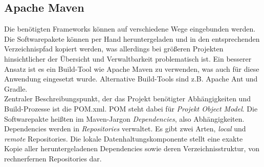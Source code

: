 \subsection{Apache Maven}
Die benötigten Frameworks können auf verschiedene Wege eingebunden werden. Die Softwarepakete können per Hand heruntergeladen und in den entsprechenden Verzeichnispfad kopiert werden, was allerdings bei größeren Projekten hinsichtlicher der Übersicht und Verwaltbarkeit problematisch ist. Ein besserer Ansatz ist es ein Build-Tool wie Apache Maven zu verwenden, was auch für diese Anwendung eingesetzt wurde. Alternative Build-Tools sind z.B. Apache Ant und Gradle.\\
Zentraler Beschreibungspunkt, der das Projekt benötigter Abhängigkeiten und Build-Prozesse ist die POM.xml. POM steht dabei für \emph{Projekt Object Model}.
Die Softwarepakte heißten im Maven-Jargon \emph{Dependencies}, also Abhängigkeiten. Dependencies werden in \emph{Repositories} verwaltet. Es gibt zwei Arten, \emph{local} und \emph{remote} Repositories.   
Die lokale Datenhaltungskomponente stellt eine exakte Kopie aller heruntergeladenen Dependencies sowie deren Verzeichnisstruktur, von rechnerfernen Repositories dar. 
